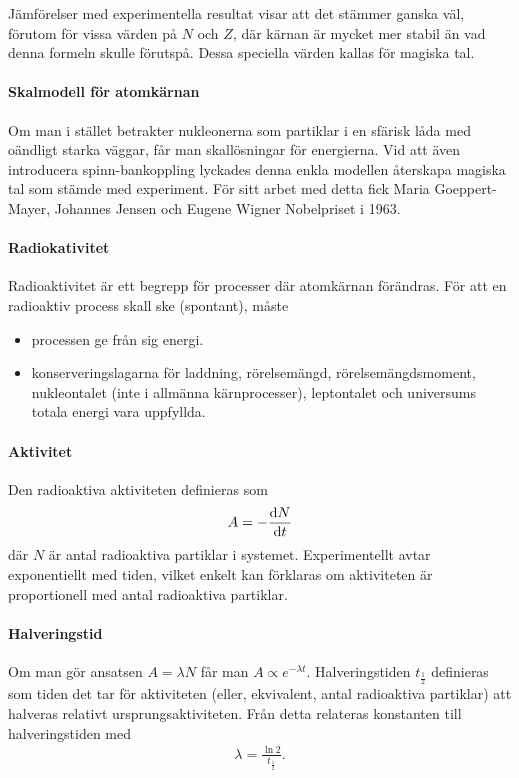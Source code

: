 Jämförelser med experimentella resultat visar att det stämmer ganska väl, förutom för vissa värden på $N$ och $Z$, där kärnan är mycket mer stabil än vad denna formeln skulle förutspå. Dessa speciella värden kallas för magiska tal.

\paragraph{Skalmodell för atomkärnan}
Om man i stället betrakter nukleonerna som partiklar i en sfärisk låda med oändligt starka väggar, får man skallösningar för energierna. Vid att även introducera spinn-bankoppling lyckades denna enkla modellen återskapa magiska tal som stämde med experiment. För sitt arbet med detta fick Maria Goeppert-Mayer, Johannes Jensen och Eugene Wigner Nobelpriset i 1963.

\paragraph{Radiokativitet}
Radioaktivitet är ett begrepp för processer där atomkärnan förändras. För att en radioaktiv process skall ske (spontant), måste
\begin{itemize}
	\item processen ge från sig energi.
	\item konserveringslagarna för laddning, rörelsemängd, rörelsemängdsmoment, nukleontalet (inte i allmänna kärnprocesser), leptontalet och universums totala energi vara uppfyllda.
\end{itemize}

\paragraph{Aktivitet}
Den radioaktiva aktiviteten definieras som
\begin{align*}
	A = -\dv{N}{t}
\end{align*}
där $N$ är antal radioaktiva partiklar i systemet. Experimentellt avtar exponentiellt med tiden, vilket enkelt kan förklaras om aktiviteten är proportionell med antal radioaktiva partiklar.

\paragraph{Halveringstid}
Om man gör ansatsen $A = \lambda N$ får man $A\propto e^{-\lambda t}$. Halveringstiden $t_{\frac{1}{2}}$ definieras som tiden det tar för aktiviteten (eller, ekvivalent, antal radioaktiva partiklar) att halveras relativt ursprungsaktiviteten. Från detta relateras konstanten till halveringstiden med
\begin{align*}
	\lambda = \frac{\ln{2}}{t_{\frac{1}{2}}}.
\end{align*}

